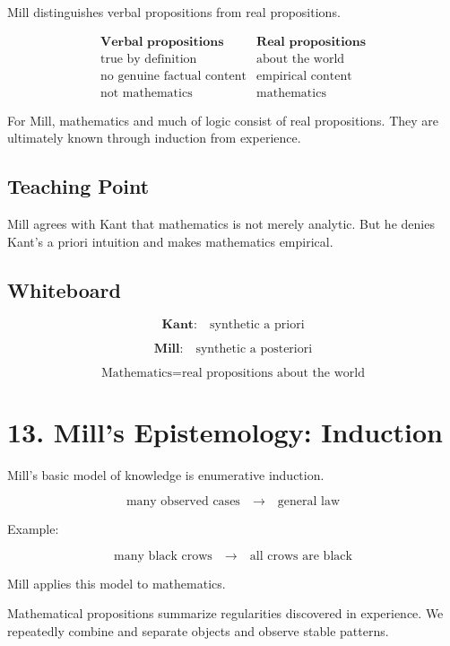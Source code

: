 \documentclass[11pt]{article}
\begin{document}
Mill distinguishes verbal propositions from real propositions.

\[
\begin{array}{c|c}
\textbf{Verbal propositions} & \textbf{Real propositions} \\
\hline
\text{true by definition} &
\text{about the world} \\
\text{no genuine factual content} &
\text{empirical content} \\
\text{not mathematics} &
\text{mathematics}
\end{array}
\]

For Mill, mathematics and much of logic consist of real propositions. They are ultimately
known through induction from experience.

\subsection*{Teaching Point}

Mill agrees with Kant that mathematics is not merely analytic. But he denies Kant's
a priori intuition and makes mathematics empirical.

\subsection*{Whiteboard}

\[
\textbf{Kant:}
\quad
\text{synthetic a priori}
\]

\[
\textbf{Mill:}
\quad
\text{synthetic a posteriori}
\]

\[
\text{Mathematics} = \text{real propositions about the world}
\]

\section*{13. Mill's Epistemology: Induction}

Mill's basic model of knowledge is enumerative induction.

\[
\text{many observed cases}
\quad \longrightarrow \quad
\text{general law}
\]

Example:

\[
\text{many black crows}
\quad \longrightarrow \quad
\text{all crows are black}
\]

Mill applies this model to mathematics.

Mathematical propositions summarize regularities discovered in experience. We repeatedly
combine and separate objects and observe stable patterns.
\end{document}
